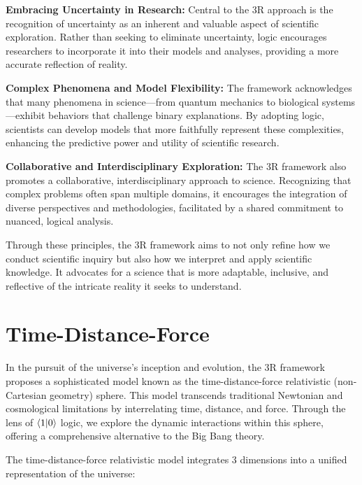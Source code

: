\documentclass[12pt]{article}
\begin{document}
\textbf{Embracing Uncertainty in Research:} Central to the 3R approach is the recognition of uncertainty as an inherent and valuable aspect of scientific exploration. Rather than seeking to eliminate uncertainty, \qbit{} logic encourages researchers to incorporate it into their models and analyses, providing a more accurate reflection of reality.

\textbf{Complex Phenomena and Model Flexibility:} The framework acknowledges that many phenomena in science—from quantum mechanics to biological systems—exhibit behaviors that challenge binary explanations. By adopting \qbit{} logic, scientists can develop models that more faithfully represent these complexities, enhancing the predictive power and utility of scientific research.

\textbf{Collaborative and Interdisciplinary Exploration:} The 3R framework also promotes a collaborative, interdisciplinary approach to science. Recognizing that complex problems often span multiple domains, it encourages the integration of diverse perspectives and methodologies, facilitated by a shared commitment to nuanced, logical analysis.

Through these principles, the 3R framework aims to not only refine how we conduct scientific inquiry but also how we interpret and apply scientific knowledge. It advocates for a science that is more adaptable, inclusive, and reflective of the intricate reality it seeks to understand.

\section*{Time-Distance-Force}

In the pursuit of the universe's inception and evolution, the 3R framework proposes a sophisticated model known as the time-distance-force relativistic (non-Cartesian geometry) sphere. This model transcends traditional Newtonian and cosmological limitations by interrelating time, distance, and force. Through the lens of \(\langle 1 | 0 \rangle\) logic, we explore the dynamic interactions within this sphere, offering a comprehensive alternative to the Big Bang theory.

The time-distance-force relativistic model integrates 3 dimensions into a unified representation of the universe:
\end{document}

